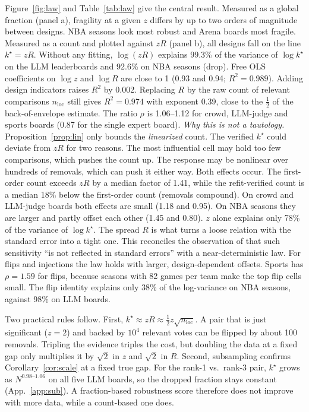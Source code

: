 \documentclass{article}
\newcommand{\kstar}{k^\star}
\begin{document}
Figure~\ref{fig:law} and Table~\ref{tab:law} give the central result. Measured as a global fraction (panel a), fragility at a given $z$ differs by up to two orders of magnitude between designs. NBA seasons look most robust and Arena boards most fragile. Measured as a count and plotted against $zR$ (panel b), all designs fall on the line $\kstar=zR$. Without any fitting, $\log(zR)$ explains 99.3\% of the variance of $\log\kstar$ on the LLM leaderboards and 92.6\% on NBA seasons (drop). Free OLS coefficients on $\log z$ and $\log R$ are close to 1 (0.93 and 0.94; $R^2=0.989$). Adding design indicators raises $R^2$ by 0.002. Replacing $R$ by the raw count of relevant comparisons $n_{\mathrm{loc}}$ still gives $R^2=0.974$ with exponent 0.39, close to the $\tfrac12$ of the back-of-envelope estimate. The ratio $\rho$ is 1.06--1.12 for crowd, LLM-judge and sports boards (0.87 for the single expert board). \emph{Why this is not a tautology.} Proposition~\ref{prop:lin} only bounds the \emph{linearized} count. The verified $\kstar$ could deviate from $zR$ for two reasons. The most influential cell may hold too few comparisons, which pushes the count up. The response may be nonlinear over hundreds of removals, which can push it either way. Both effects occur. The first-order count exceeds $zR$ by a median factor of 1.41, while the refit-verified count is a median 18\% below the first-order count (removals compound). On crowd and LLM-judge boards both effects are small (1.18 and 0.95). On NBA seasons they are larger and partly offset each other (1.45 and 0.80). $z$ alone explains only 78\% of the variance of $\log\kstar$. The spread $R$ is what turns a loose relation with the standard error into a tight one. This reconciles the observation of \citet{broderick2020automatic} that such sensitivity ``is not reflected in standard errors'' with a near-deterministic law. For flips and injections the law holds with larger, design-dependent offsets. Sports has $\rho=1.59$ for flips, because seasons with 82 games per team make the top flip cells small. The flip identity explains only 38\% of the log-variance on NBA seasons, against 98\% on LLM boards.

Two practical rules follow. First, $\kstar\approx zR\approx\tfrac12 z\sqrt{n_{\mathrm{loc}}}$. A pair that is just significant ($z=2$) and backed by $10^4$ relevant votes can be flipped by about 100 removals. Tripling the evidence triples the cost, but doubling the data at a fixed gap only multiplies it by $\sqrt2$ in $z$ and $\sqrt2$ in $R$. Second, subsampling confirms Corollary~\ref{cor:scale} at a fixed true gap. For the rank-1 vs.\ rank-3 pair, $\kstar$ grows as $N^{0.98\text{--}1.06}$ on all five LLM boards, so the dropped fraction stays constant (App.~\ref{app:sub}). A fraction-based robustness score therefore does not improve with more data, while a count-based one does.
\end{document}
